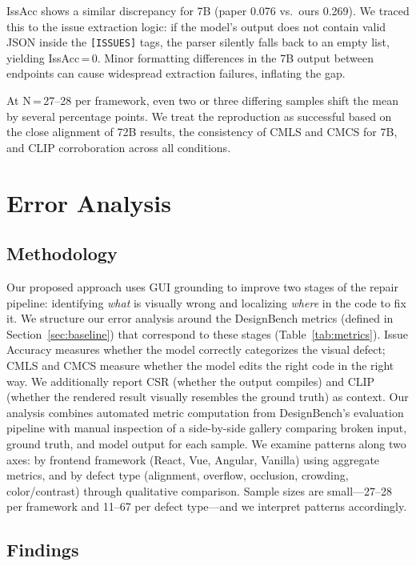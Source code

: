\documentclass[11pt]{article}
\begin{document}
IssAcc shows a similar discrepancy for 7B (paper 0.076 vs.\ ours
0.269). We traced this to the issue extraction logic: if the model's
output does not contain valid JSON inside the \texttt{[ISSUES]} tags,
the parser silently falls back to an empty list, yielding
IssAcc\,=\,0. Minor formatting differences in the 7B output between
endpoints can cause widespread extraction failures, inflating the gap.

At N\,=\,27--28 per framework, even two or three differing samples shift
the mean by several percentage points. We treat the reproduction as
successful based on the close alignment of 72B results, the consistency
of CMLS and CMCS for 7B, and CLIP corroboration across all conditions.


\section{Error Analysis}

\subsection{Methodology}

Our proposed approach uses GUI grounding to improve two stages of the
repair pipeline: identifying \textit{what} is visually wrong and
localizing \textit{where} in the code to fix it. We structure our error
analysis around the DesignBench metrics (defined in Section~\ref{sec:baseline})
that correspond to these stages (Table~\ref{tab:metrics}). Issue Accuracy measures whether the model
correctly categorizes the visual defect; CMLS and CMCS measure whether
the model edits the right code in the right way. We additionally report
CSR (whether the output compiles) and CLIP (whether the rendered result
visually resembles the ground truth) as context. Our analysis combines
automated metric computation from DesignBench's evaluation pipeline with
manual inspection of a side-by-side gallery comparing broken input,
ground truth, and model output for each sample. We examine patterns
along two axes: by frontend framework (React, Vue, Angular, Vanilla)
using aggregate metrics, and by defect type (alignment, overflow,
occlusion, crowding, color/contrast) through qualitative comparison.
Sample sizes are small---27--28 per framework and 11--67 per defect
type---and we interpret patterns accordingly.


\subsection{Findings}
\end{document}
